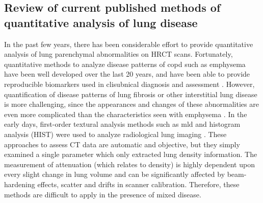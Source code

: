 \subsection{Review of current published methods of quantitative analysis of lung disease} \label{Review}
In the past few years, there has been considerable effort to provide quantitative analysis of lung parenchymal abnormalities on HRCT scans. Fortunately, quantitative methods to analyze disease patterns of \gls{copd} such as emphysema have been well developed over the last 20 years, and have been able to provide reproducible biomarkers used in clisubnical diagnosis and assessment \citep{da2008identification,gietema2011quantifying,galban2012computed,wang2013high,castaldi2013distinct}. However, quantification of disease patterns of lung fibrosis or other interstitial lung disease is more challenging, since the appearances and changes of these abnormalities are even more complicated than the characteristics seen with emphysema \citep{lynch2007quantitative, delorme1997usual, galban2012computed, depeursinge2010comparative}. In the early days, first-order textural analysis methods such as \gls{mld} and histogram analysis (HIST) were used to analyze radiological lung imaging \citep{gilman1983ct,gould1988ct,muller1988density,kinsella1990quantitation,knudson1991expiratory,behr1992evaluation}. These approaches to assess CT data are automatic and objective, but they simply examined a single parameter which only extracted lung density information. The measurement of attenuation (which relates to density) is highly dependent upon every slight change in lung volume and can be significantly affected by beam-hardening effects, scatter and drifts in scanner calibration. Therefore, these methods are difficult to apply in the presence of mixed disease.

